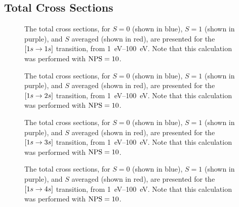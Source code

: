 \documentclass{article}
\begin{document}
\subsection{Total Cross Sections}
\label{sec:tcs}

\begin{figure}[h]
  \begin{center}
    
  \end{center}
  \caption[Total Cross Sections for $\lrsq{1s \to 1s}$]{
    The total cross sections, for $S = 0$ (shown in blue), $S = 1$ (shown in
    purple), and $S$ averaged (shown in red), are presented for the
    $\lrsq{1s \to 1s}$ transition, from \SIrange{1}{100}{\eV}.
    Note that this calculation was performed with $\rm{NPS} = 10$.
  }
  \label{fig:tcs-1s}
\end{figure}

\begin{figure}[h]
  \begin{center}
    
  \end{center}
  \caption[Total Cross Sections for $\lrsq{1s \to 2s}$]{
    The total cross sections, for $S = 0$ (shown in blue), $S = 1$ (shown in
    purple), and $S$ averaged (shown in red), are presented for the
    $\lrsq{1s \to 2s}$ transition, from \SIrange{1}{100}{\eV}.
    Note that this calculation was performed with $\rm{NPS} = 10$.
  }
  \label{fig:tcs-2s}
\end{figure}

\begin{figure}[h]
  \begin{center}
    
  \end{center}
  \caption[Total Cross Sections for $\lrsq{1s \to 3s}$]{
    The total cross sections, for $S = 0$ (shown in blue), $S = 1$ (shown in
    purple), and $S$ averaged (shown in red), are presented for the
    $\lrsq{1s \to 3s}$ transition, from \SIrange{1}{100}{\eV}.
    Note that this calculation was performed with $\rm{NPS} = 10$.
  }
  \label{fig:tcs-3s}
\end{figure}

\begin{figure}[h]
  \begin{center}
    
  \end{center}
  \caption[Total Cross Sections for $\lrsq{1s \to 4s}$]{
    The total cross sections, for $S = 0$ (shown in blue), $S = 1$ (shown in
    purple), and $S$ averaged (shown in red), are presented for the
    $\lrsq{1s \to 4s}$ transition, from \SIrange{1}{100}{\eV}.
    Note that this calculation was performed with $\rm{NPS} = 10$.
  }
  \label{fig:tcs-4s}
\end{figure}
\end{document}

